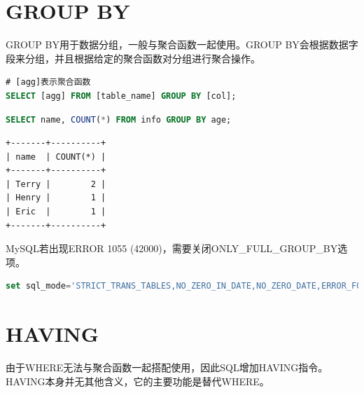 \documentclass[12pt, openany, oneside]{book}
\begin{document}
\vspace{0.5cm}

\section{GROUP BY}

GROUP BY用于数据分组，一般与聚合函数一起使用。GROUP BY会根据数据字段来分组，并且根据给定的聚合函数对分组进行聚合操作。

\vspace{-0.5cm}

\begin{lstlisting}[language=SQL]
# [agg]表示聚合函数
SELECT [agg] FROM [table_name] GROUP BY [col];
\end{lstlisting}

\vspace{0.5cm}


\begin{lstlisting}[language=SQL]
SELECT name, COUNT(*) FROM info GROUP BY age;
\end{lstlisting}

\begin{tcolorbox}
	\begin{verbatim}
+-------+----------+
| name  | COUNT(*) |
+-------+----------+
| Terry |        2 |
| Henry |        1 |
| Eric  |        1 |
+-------+----------+
	\end{verbatim}
\end{tcolorbox}

MySQL若出现ERROR 1055 (42000)，需要关闭ONLY\_FULL\_GROUP\_BY选项。

\vspace{-0.5cm}

\begin{lstlisting}[language=SQL, breaklines=true, breakatwhitespace=false]
set sql_mode='STRICT_TRANS_TABLES,NO_ZERO_IN_DATE,NO_ZERO_DATE,ERROR_FOR_DIVISION_BY_ZERO,NO_ENGINE_SUBSTITUTION';
\end{lstlisting}

\vspace{0.5cm}

\section{HAVING}

由于WHERE无法与聚合函数一起搭配使用，因此SQL增加HAVING指令。HAVING本身并无其他含义，它的主要功能是替代WHERE。\\
\end{document}
